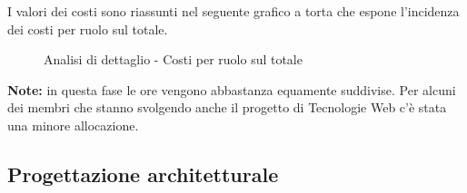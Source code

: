 			\noindent
			I valori dei costi sono riassunti nel seguente grafico a torta che espone l’incidenza dei costi per ruolo sul totale.
			\begin{center}
				\begin{figure}[htbp]
				\vspace{0.8cm}
				\caption{Analisi di dettaglio - Costi per ruolo sul totale}
				\end{figure}
			\end{center}
		\noindent
		\textbf{Note:} in questa fase le ore vengono abbastanza equamente suddivise. Per alcuni dei membri che stanno svolgendo anche il progetto di Tecnologie Web c'è stata una minore allocazione.
	
	\newpage
	\subsection{Progettazione architetturale} %
	\label{sub:progettazione_architetturale}
